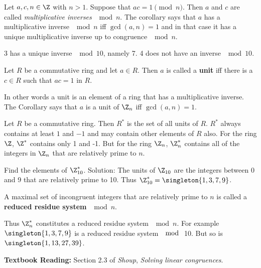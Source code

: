 \documentclass[oneside,12pt]{amsart}
\begin{document}
\begin{definition}
Let $a,c, n\in \Z$ with $n>1$. Suppose that $ac=1 \pmod n$. Then $a$ and $c$ are called \emph{multiplicative inverses} $\mod n$.
The corollary says that $a$ has a multiplicative inverse $\mod n$ iff $\gcd(a,n)=1$ and in that case it has a unique multiplicative
inverse up to congruence $\mod n$.
\end{definition}

\begin{numbered_example}
3 has a unique inverse $\mod 10$, namely 7. 4 does not have an inverse $\mod 10$.
\end{numbered_example}

\begin{definition}
Let $R$ be a commutative ring and let $a\in R$. Then $a$ is called a \textbf{unit} iff there is a $c\in R$ such that $ac=1$ in $R$.
\end{definition}

In other words a unit is an element of a ring that has a multiplicative inverse. The Corollary says that $a$ is a unit of $\Z_n$ iff
$\gcd(a,n) = 1$.

\begin{definition}
Let $R$ be a commutative ring. Then $R^*$ is the set of all units of $R$. $R^*$ always contains at least $1$ and $-1$
and may contain other elements of $R$ also. For the ring $\Z$, $\Z^*$ contains only 1 and -1. But for the ring $\Z_n$,
$\Z^*_n$ contains all of the integers in $\Z_n$ that are relatively prime to $n$.
\end{definition}

\begin{numbered_example}
Find the elements of $\Z_{10}^*$. Solution: The units of $\Z_{10}$ are the integers between 0 and 9 that are relatively prime to 10.
Thus $\Z_{10}^*=\singleton{1,3,7,9}$.
\end{numbered_example}

\begin{definition}
A maximal set of incongruent integers that are relatively prime to $n$ is called a \textbf{reduced residue system} $\mod n$.
\end{definition}

Thus $\Z_n^*$ constitutes a reduced residue system $\mod n$. For example $\singleton{1,3,7,9}$ is a reduced residue system $\mod$ 10.
But so is $\singleton{1,13,27,39}$.


\textbf{Textbook Reading:} Section 2.3 of \emph{Shoup}, \emph{Solving linear congruences}.
\end{document}
